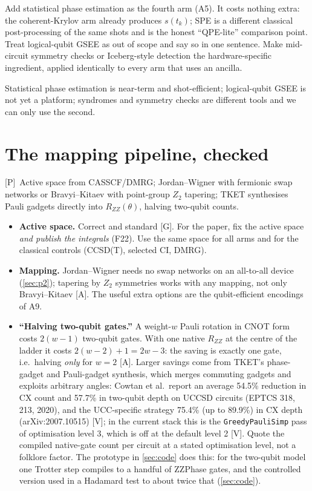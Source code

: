 \documentclass[11pt,a4paper]{article}
\newcommand{\lP}{\textcolor{keyblue}{[P]}}   %
\newcommand{\lV}{\textcolor{keyblue}{[V]}}   %
\newcommand{\lA}{\textcolor{notegray}{[A]}}  %
\newcommand{\lG}{\textcolor{alertred}{[G]}}  %
\newcommand{\takeaway}[1]{\par\smallskip\noindent{\bfseries\textcolor{keyblue}{Takeaway.}} #1\par\smallskip}
\newcommand{\verdict}[1]{\par\smallskip\noindent{\bfseries\textcolor{keyblue}{Verdict for our paper.}} #1\par\smallskip}
\begin{document}
\verdict{Add statistical phase estimation as the fourth arm (A5). It costs nothing extra: the coherent-Krylov arm already produces $s(t_k)$; SPE is a different classical post-processing of the same shots and is the honest ``QPE-lite'' comparison point. Treat logical-qubit GSEE as out of scope and say so in one sentence. Make mid-circuit symmetry checks or Iceberg-style detection the hardware-specific ingredient, applied identically to every arm that uses an ancilla.}

\takeaway{Statistical phase estimation is near-term and shot-efficient; logical-qubit GSEE is not yet a platform; syndromes and symmetry checks are different tools and we can only use the second.}

\section{The mapping pipeline, checked}\label{sec:pipeline}
\lP\ Active space from CASSCF/DMRG; Jordan--Wigner with fermionic swap networks or Bravyi--Kitaev with point-group $Z_2$ tapering; TKET synthesises Pauli gadgets directly into $R_{ZZ}(\theta)$, halving two-qubit counts.

\begin{itemize}
\item \textbf{Active space.} Correct and standard \lG. For the paper, fix the active space \emph{and publish the integrals} (F22). Use the same space for all arms and for the classical controls (CCSD(T), selected CI, DMRG).
\item \textbf{Mapping.} Jordan--Wigner needs no swap networks on an all-to-all device (\cref{sec:p2}); tapering by $Z_2$ symmetries works with any mapping, not only Bravyi--Kitaev \lA. The useful extra options are the qubit-efficient encodings of A9.
\item \textbf{``Halving two-qubit gates.''} A weight-$w$ Pauli rotation in CNOT form costs $2(w-1)$ two-qubit gates. With one native $R_{ZZ}$ at the centre of the ladder it costs $2(w-2)+1=2w-3$: the saving is exactly one gate, i.e.\ halving \emph{only} for $w=2$ \lA. Larger savings come from TKET's phase-gadget and Pauli-gadget synthesis, which merges commuting gadgets and exploits arbitrary angles: Cowtan et al.\ report an average 54.5\% reduction in CX count and 57.7\% in two-qubit depth on UCCSD circuits (EPTCS 318, 213, 2020), and the UCC-specific strategy 75.4\% (up to 89.9\%) in CX depth (arXiv:2007.10515) \lV; in the current stack this is the \texttt{GreedyPauliSimp} pass of optimisation level 3, which is off at the default level 2 \lV. Quote the compiled native-gate count per circuit at a stated optimisation level, not a folklore factor. The prototype in \cref{sec:code} does this: for the two-qubit model one Trotter step compiles to a handful of ZZPhase gates, and the controlled version used in a Hadamard test to about twice that (\cref{sec:code}).
\end{itemize}
\end{document}
